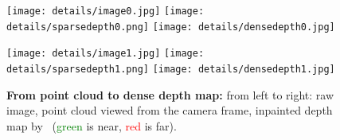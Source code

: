 \begin{figure}

		\centering
		
		\texttt{[image: details/image0.jpg]}\hfill
		\texttt{[image: details/sparsedepth0.png]}\hfill
		\texttt{[image: details/densedepth0.jpg]}\hfill
		
		\texttt{[image: details/image1.jpg]}\hfill
		\texttt{[image: details/sparsedepth1.png]}\hfill
		\texttt{[image: details/densedepth1.jpg]}\hfill
		\caption[Point cloud to depth map]{\label{fig:depth_map} \textbf{From point cloud to dense depth map:} from left to right: raw image, point cloud viewed from the camera frame, inpainted depth map by~\citep{Bevilacqua2017} (\textcolor{green}{green} is near, \textcolor{red}{red} is far).}

\end{figure}
	